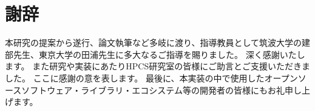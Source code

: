 \documentclass[a4paper,11pt]{jreport}
\begin{document}
\chapter*{謝辞}


本研究の提案から遂行、論文執筆など多岐に渡り、指導教員として筑波大学の建部先生、東京大学の田浦先生に多大なるご指導を賜りました。
深く感謝いたします。
また研究や実装にあたりHPCS研究室の皆様にご助言とご支援いただきました。
ここに感謝の意を表します。
最後に、本実装の中で使用したオープンソースソフトウェア・ライブラリ・エコシステム等の開発者の皆様にもお礼申し上げます。


\newpage

\renewcommand{\bibname}{参考文献}

%
%
\end{document}
